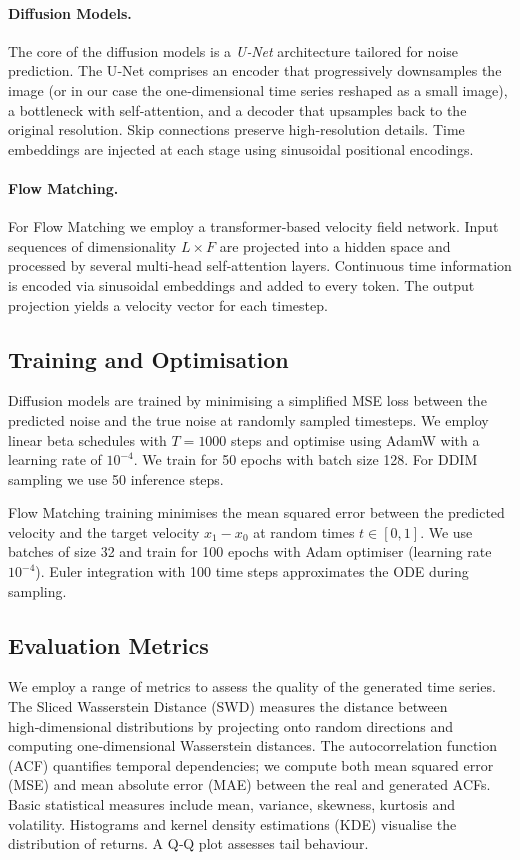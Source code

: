 \paragraph{Diffusion Models.}  The core of the diffusion models is a
\emph{U‑Net} architecture tailored for noise prediction.  The U‑Net
comprises an encoder that progressively downsamples the image (or in
our case the one‑dimensional time series reshaped as a small image),
a bottleneck with self‑attention, and a decoder that upsamples back to
the original resolution.  Skip connections preserve high‑resolution
details.  Time embeddings are injected at each stage using
sinusoidal positional encodings.

\paragraph{Flow Matching.}  For Flow Matching we employ a
transformer‑based velocity field network.  Input sequences of
dimensionality $L \times F$ are projected into a hidden space and
processed by several multi‑head self‑attention layers.  Continuous
time information is encoded via sinusoidal embeddings and added to
every token.  The output projection yields a velocity vector for
each timestep.

\subsection{Training and Optimisation}

Diffusion models are trained by minimising a simplified MSE loss
between the predicted noise and the true noise at randomly sampled
timesteps.  We employ linear beta schedules with $T=1000$ steps and
optimise using AdamW with a learning rate of $10^{-4}$.  We train
for 50 epochs with batch size 128.  For DDIM sampling we use 50
inference steps.

Flow Matching training minimises the mean squared error between the
predicted velocity and the target velocity $x_1 - x_0$ at random
times $t \in [0,1]$.  We use batches of size 32 and train for 100
epochs with Adam optimiser (learning rate $10^{-4}$).  Euler
integration with 100 time steps approximates the ODE during
sampling.

\subsection{Evaluation Metrics}

We employ a range of metrics to assess the quality of the generated
time series.  The Sliced Wasserstein Distance (SWD) measures the
distance between high‑dimensional distributions by projecting
onto random directions and computing one‑dimensional Wasserstein
distances.  The autocorrelation function (ACF) quantifies temporal
dependencies; we compute both mean squared error (MSE) and mean
absolute error (MAE) between the real and generated ACFs.  Basic
statistical measures include mean, variance, skewness, kurtosis and
volatility.  Histograms and kernel density estimations (KDE) visualise
the distribution of returns.  A Q‑Q plot assesses tail behaviour.

